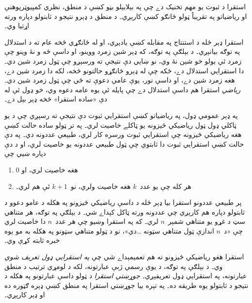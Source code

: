 \documentclass[../../../include/open-logic-section]{subfiles}
\begin{document}


استقرا د ثبوت يو مهم تخنيک دے چې په بېلابېلو بڼو کښې د منطق،
نظري کمپيوټرپوهنې او رياضياتو په تقريباً ټولو څانګو کښې کارېږي۔
د منطق د ډېرو نتيجو د ثابتولو دپاره ورته اړتيا وي۔

استقرا ډېر ځله د استنتاج په مقابله کښې يادېږي، او له ځانګړي څخه
عام ته د استدلال په توګه بيانېږي۔ د بېلګې په توګه، که ډېر شين
زمرد ووينو، او داسې څه و نۀ وينو چې زمرد ئې بولو خو شين نۀ وي،
نو ښايي دې نتيجې ته ورسېږو چې ټول زمرد شين دي۔ دا استقرايي
استدلال دے، ځکه چې له ډېرو ځانګړو حالتونو څخه، لکه دا زمرد شين
دے، هغه زمرد شين دے، او داسې نور، يوې عامې دعوې ته ځي چې ټول
زمرد شين دي۔ \emph{رياضي} استقرا هم داسې استدلال دے چې پايله ئې
يوه عامه دعوه وي، خو ډول ئې له دې «ساده استقرا» څخه ډېر بېل دے۔

په ډېر عمومي ډول، په رياضياتو کښې استقرايي ثبوت دې نتيجې ته
رسېږي چې د يو ټاکلي ډول ټول رياضيکي څيزونه يو ټاکلے خاصيت لري۔
په تر ټولو ساده حالت کښې هغه رياضيکي څيزونه چې استقرايي ثبوت
ورسره کار لري، طبيعي عددونه دي۔ په دې حالت کښې استقرايي ثبوت
دا ثابتوي چې ټول طبيعي عددونه يو خاصيت لري، او د دې دپاره ښيي چې
\begin{enumerate}
    \item $0$ هغه خاصيت لري، او
    \item هر کله چې يو عدد~$k$ هغه خاصيت ولري، نو~$k+1$ ئې هم لري۔
\end{enumerate}
پر طبيعي عددونو استقرا بيا ډېر ځله د داسې رياضيکي څيزونو په
هکله د عامو دعوو د ثابتولو دپاره هم کارېږي چې عددونه ورته
ټاکل کېداے شي۔ د بېلګې په توګه، هر متناهي سټ د غړو يو متناهي
شمېر~$n$ لري۔ که په استقرا وښيو چې هر عدد~$n$ دا خاصيت لري چې
«د~$n$ اندازې ټول متناهي سټونه \dots دي»، نو د ټولو متناهي
سټونو په هکله به مو يوه خبره ثابته کړې وي۔

استقرا هغو رياضيکي څيزونو ته هم تعميمېداے شي چې
\emph{په استقرايي ډول تعريف شوي} وي۔ د بېلګې په توګه، د يوې
رسمي ژبې عبارتونه، لکه د لومړي ترتيب د منطق عبارتونه، په
استقرايي ډول تعريفېږي۔ \emph{جوړښتي استقرا} د ټولو داسې
عبارتونو په هکله د نتيجو د ثابتولو يوه طريقه ده۔ په تېره بيا
جوړښتي استقرا په منطق کښې ډېره ګټوره ده او ډېر کارېږي۔
\end{document}
